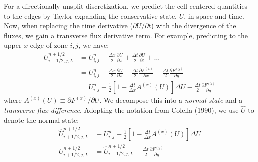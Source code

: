 For a directionally-unsplit discretization, we predict the
cell-centered quantities to the edges by Taylor expanding the
conservative state, $U$, in space and time.  Now, when replacing the
time derivative ($\partial U/\partial t$) with the divergence of the
fluxes, we gain a transverse flux derivative term.  For example,
predicting to the upper $x$ edge of zone $i,j$, we have:
\begin{align}
U_{i+1/2,j,L}^{n+1/2} &= U_{i,j}^n + \frac{\Delta x}{2} \frac{\partial U}{\partial x}
                            + \frac{\Delta t}{2} \frac{\partial U}{\partial t} + \ldots \\
&= U_{i,j}^n + \frac{\Delta x}{2} \frac{\partial U}{\partial x}
                            - \frac{\Delta t}{2} \frac{\partial F^{(x)}}{\partial x}
                            - \frac{\Delta t}{2} \frac{\partial F^{(y)}}{\partial y} \\
&= U_{i,j}^n + \frac{1}{2} \left [ 1 - \frac{\Delta t}{\Delta x} A^{(x)}(U) \right ] \Delta U
                            - \frac{\Delta t}{2} \frac{\partial F^{(y)}}{\partial y} \label{eq:Utaylorstate}
\end{align}
where $A^{(x)}(U) \equiv \partial F^{(x)} / \partial U$.  We decompose
this into a {\em normal state} and a {\em transverse flux difference}.
Adopting the notation from Colella (1990), we use $\hat{U}$ to denote
the normal state:
\begin{align}
\hat{U}_{i+1/2,j,L}^{n+1/2} &\equiv U_{i,j}^n
      + \frac{1}{2} \left [ 1 - \frac{\Delta t}{\Delta x} A^{(x)}(U) \right ] \Delta U \\
U_{i+1/2,j,L}^{n+1/2} &= \hat{U}_{i+1/2,j,L}^{n+1/2}
                            - \frac{\Delta t}{2} \frac{\partial F^{(y)}}{\partial y}  \label{eq:fullleftstate}
\end{align}

